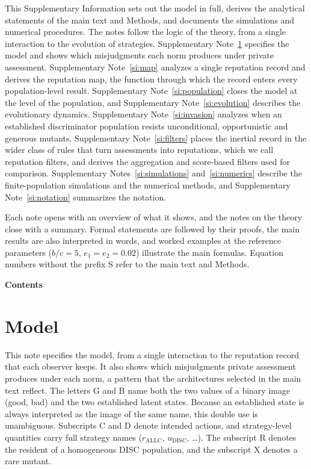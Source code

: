 \documentclass[10pt]{wlscirep}
\newcommand{\ALLC}{\mathrm{ALLC}}
\newcommand{\DISC}{\mathrm{DISC}}
\theoremstyle{plain}
\theoremstyle{remark}
\begin{document}
This Supplementary Information sets out the model in full, derives the analytical statements of the main text and Methods, and documents the simulations and numerical procedures. The notes follow the logic of the theory, from a single interaction to the evolution of strategies. Supplementary Note~\ref{si:model} specifies the model and shows which misjudgments each norm produces under private assessment. Supplementary Note~\ref{si:map} analyzes a single reputation record and derives the reputation map, the function through which the record enters every population-level result. Supplementary Note~\ref{si:population} closes the model at the level of the population, and Supplementary Note~\ref{si:evolution} describes the evolutionary dynamics. Supplementary Note~\ref{si:invasion} analyzes when an established discriminator population resists unconditional, opportunistic and generous mutants. Supplementary Note~\ref{si:filters} places the inertial record in the wider class of rules that turn assessments into reputations, which we call reputation filters, and derives the aggregation and score-based filters used for comparison. Supplementary Notes~\ref{si:simulations} and~\ref{si:numerics} describe the finite-population simulations and the numerical methods, and Supplementary Note~\ref{si:notation} summarizes the notation.

Each note opens with an overview of what it shows, and the notes on the theory close with a summary. Formal statements are followed by their proofs, the main results are also interpreted in words, and worked examples at the reference parameters ($b/c=5$, $e_1=e_2=0.02$) illustrate the main formulas. Equation numbers without the prefix S refer to the main text and Methods.

\startcontents[si]
\vskip10pt
{\sffamily\bfseries\large Contents\par}
\vskip4pt
\vskip12pt

\FloatBarrier
\section{Model}
\label{si:model}

This note specifies the model, from a single interaction to the reputation record that each observer keeps. It also shows which misjudgments private assessment produces under each norm, a pattern that the architectures selected in the main text reflect. The letters G and B name both the two values of a binary image (good, bad) and the two established latent states. Because an established state is always interpreted as the image of the same name, this double use is unambiguous. Subscripts C and D denote intended actions, and strategy-level quantities carry full strategy names ($r_{\ALLC}$, $u_{\DISC}$, \ldots). The subscript R denotes the resident of a homogeneous DISC population, and the subscript X denotes a rare mutant.
\end{document}
